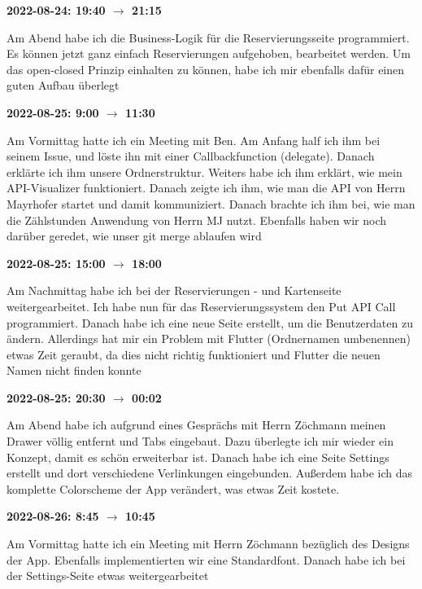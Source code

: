 \vspace{0.5cm} \textbf{2022-08-24: 19:40 $\rightarrow$ 21:15} 

Am Abend habe ich die Business-Logik für die Reservierungsseite
programmiert. Es können jetzt ganz einfach Reservierungen aufgehoben,
bearbeitet werden. Um das open-closed Prinzip einhalten zu können, habe
ich mir ebenfalls dafür einen guten Aufbau überlegt

\vspace{0.5cm} \textbf{2022-08-25: 9:00 $\rightarrow$ 11:30}

Am Vormittag hatte ich ein Meeting mit Ben. Am Anfang half ich ihm bei
seinem Issue, und löste ihn mit einer Callbackfunction (delegate).
Danach erklärte ich ihm unsere Ordnerstruktur. Weiters habe ich ihm
erklärt, wie mein API-Visualizer funktioniert. Danach zeigte ich ihm,
wie man die API von Herrn Mayrhofer startet und damit kommuniziert.
Danach brachte ich ihm bei, wie man die Zählstunden Anwendung von Herrn MJ
nutzt. Ebenfalls haben wir noch darüber geredet, wie unser git merge
ablaufen wird

\vspace{0.5cm} \textbf{2022-08-25: 15:00 $\rightarrow$ 18:00}

Am Nachmittag habe ich bei der Reservierungen - und Kartenseite
weitergearbeitet. Ich habe nun für das Reservierungssystem den Put API
Call programmiert. Danach habe ich eine neue Seite erstellt, um die
Benutzerdaten zu ändern. Allerdings hat mir ein Problem mit Flutter
(Ordnernamen umbenennen) etwas Zeit geraubt, da dies nicht richtig
funktioniert und Flutter die neuen Namen nicht finden konnte

\vspace{0.5cm} \textbf{2022-08-25: 20:30 $\rightarrow$ 00:02}

Am Abend habe ich aufgrund eines Gesprächs mit Herrn Zöchmann meinen
Drawer völlig entfernt und Tabs eingebaut. Dazu überlegte ich mir
wieder ein Konzept, damit es schön erweiterbar ist. Danach habe ich
eine Seite Settings erstellt und dort verschiedene Verlinkungen
eingebunden. Außerdem habe ich das komplette Colorscheme der App
verändert, was etwas Zeit kostete.

\vspace{0.5cm} \textbf{2022-08-26: 8:45 $\rightarrow$ 10:45}

Am Vormittag hatte ich ein Meeting mit Herrn Zöchmann bezüglich des
Designs der App. Ebenfalls implementierten wir eine Standardfont.
Danach habe ich bei der Settings-Seite etwas weitergearbeitet

